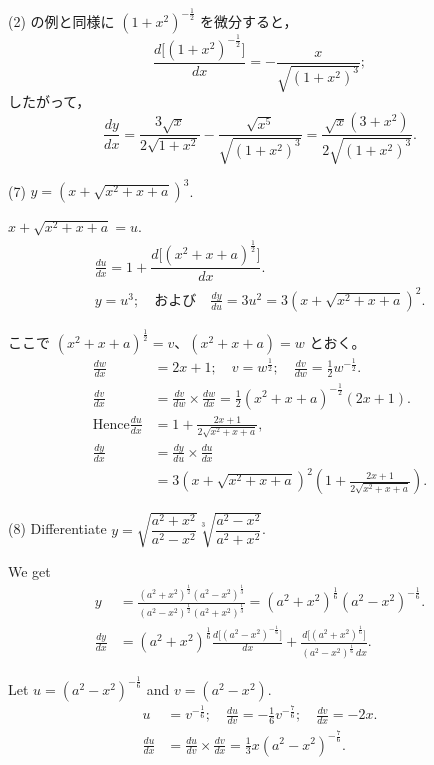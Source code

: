 \documentclass[a4paper,11pt,openany]{ltjsbook}
\begin{document}
(2) の例と同様に \( (1+x^2)^{-\frac{1}{2}} \) を微分すると，
\[
\dfrac{d\bigl[(1+x^2)^{-\frac{1}{2}}\bigr]}{dx} = - \frac{x}{\sqrt{(1+x^2)^3}};
\]
したがって，
\[
\frac{dy}{dx}
  = \frac{3\sqrt{x}}{2\sqrt{1+x^2}} - \frac{\sqrt{x^5}}{\sqrt{(1+x^2)^3}}
  = \frac{\sqrt{x}(3+x^2)}{2\sqrt{(1+x^2)^3}}.
\]

(7) \( y = (x + \sqrt{x^2 + x + a})^3 \).

\( x + \sqrt{x^2 + x + a} = u \).
\begin{gather*}
\frac{du}{dx} = 1 + \dfrac{d\bigl[(x^2 + x + a)^{\frac{1}{2}}\bigr]}{dx}. \\
y = u^3; \quad \text{および} \quad \frac{dy}{du} = 3u^2 = 3\left(x + \sqrt{x^2 + x + a}\right)^2.
\end{gather*}

ここで $(x^2+x+a)^{\frac{1}{2}}=v$、$(x^2+x+a) = w$ とおく。
\begin{align*}
\frac{dw}{dx} &= 2x+1;\quad v = w^{\frac{1}{2}};\quad \frac{dv}{dw} = \frac{1}{2}w^{-\frac{1}{2}}. \\
\frac{dv}{dx} &= \frac{dv}{dw} \times \frac{dw}{dx} = \frac{1}{2}(x^2+x+a)^{-\frac{1}{2}}(2x+1). \\
\text{Hence}
\frac{du}{dx} &= 1 + \frac{2x+1}{2\sqrt{x^2+x+a}}, \\
\frac{dy}{dx} &= \frac{dy}{du} \times \frac{du}{dx}\\
&= 3\left(x+\sqrt{x^2+x+a}\right)^2
      \left(1 +\frac{2x+1}{2\sqrt{x^2+x+a}}\right).
\end{align*}

(8) Differentiate $y=\sqrt{\dfrac{a^2+x^2}{a^2-x^2}} \sqrt[3]{\dfrac{a^2-x^2}{a^2+x^2}}$.

We get
\begin{align*}
y &= \frac{(a^2+x^2)^{\frac{1}{2}} (a^2-x^2)^{\frac{1}{3}}}
          {(a^2-x^2)^{\frac{1}{2}} (a^2+x^2)^{\frac{1}{3}}}
  = (a^2+x^2)^{\frac{1}{6}} (a^2-x^2)^{-\frac{1}{6}}. \\
\frac{dy}{dx} &= (a^2+x^2)^{\frac{1}{6}} \frac{d\bigl[(a^2-x^2)^{-\frac{1}{6}}\bigr]}{dx}
   + \frac{d\bigl[(a^2+x^2)^{\frac{1}{6}}\bigr]}{(a^2-x^2)^{\frac{1}{6}}\, dx}.
\end{align*}

Let $u = (a^2-x^2)^{-\frac{1}{6}}$ and $v = (a^2 - x^2)$.
\begin{align*}
u &= v^{-\frac{1}{6}};\quad
  \frac{du}{dv} = -\frac{1}{6}v^{-\frac{7}{6}};\quad
  \frac{dv}{dx} = -2x. \\
%
\frac{du}{dx} &= \frac{du}{dv} \times \frac{dv}{dx} = \frac{1}{3}x(a^2-x^2)^{-\frac{7}{6}}.
\end{align*}
\end{document}
